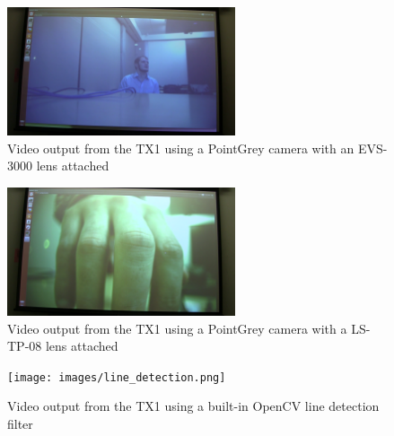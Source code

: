 \documentclass[letterpaper,10pt,titlepage]{IEEEtran}
\begin{document}
   \begin{figure}[!ht]
  \caption{Video output from the TX1 using a PointGrey camera with an EVS-3000 lens attached}
	  \centering
		    \includegraphics[width=0.6\textwidth]{images/vlcsnap-2016-02-11-17h42m53s150.png}
				\end{figure}
\begin{figure}[!ht]
  \caption{Video output from the TX1 using a PointGrey camera with a LS-TP-08 lens attached}
	  \centering
		    \includegraphics[width=0.6\textwidth]{images/vlcsnap-2016-02-11-17h42m30s486.png}
				\end{figure}
\begin{figure}[!ht]
  \caption{Video output from the TX1 using a built-in OpenCV line detection filter}
	  \centering
		    \texttt{[image: images/line\_detection.png]}
				\end{figure}
   
\end{document}
